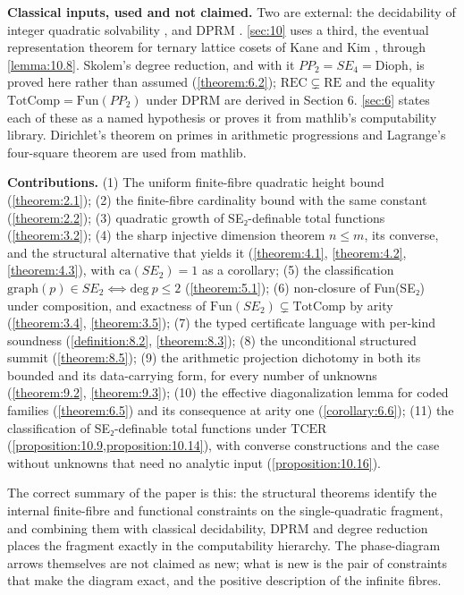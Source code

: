 \documentclass[11pt]{article}
\theoremstyle{plain}
\theoremstyle{definition}
\theoremstyle{remark}
\theoremstyle{plain}
\theoremstyle{definition}
\theoremstyle{remark}
\theoremstyle{plain}
\theoremstyle{definition}
\theoremstyle{remark}
\begin{document}
\textbf{Classical inputs, used and not claimed.} Two are external: the decidability of integer quadratic solvability \cite{GS04}, and DPRM \cite{DPR61,Mat70}. \cref{sec:10} uses a third, the eventual representation theorem for ternary lattice cosets of Kane and Kim \cite{KK26}, through \cref{lemma:10.8}. Skolem's degree reduction, and with it $PP_{2} = SE_{4} = \mathrm{Dioph}$, is proved here rather than assumed (\cref{theorem:6.2}); $\mathrm{REC} ⊊ \mathrm{RE}$ and the equality $\mathrm{TotComp} = \mathrm{Fun}(PP_{2})$ under DPRM are derived in Section 6. \cref{sec:6} states each of these as a named hypothesis or proves it from mathlib's computability library. Dirichlet's theorem on primes in arithmetic progressions and Lagrange's four-square theorem are used from mathlib.

\textbf{Contributions.} (1) The uniform finite-fibre quadratic height bound (\cref{theorem:2.1}); (2) the finite-fibre cardinality bound with the same constant (\cref{theorem:2.2}); (3) quadratic growth of SE₂-definable total functions (\cref{theorem:3.2}); (4) the sharp injective dimension theorem $n ≤ m$, its converse, and the structural alternative that yields it (\cref{theorem:4.1}, \cref{theorem:4.2}, \cref{theorem:4.3}), with $\mathrm{ca}(SE_{2}) = 1$ as a corollary; (5) the classification $\mathrm{graph}(p) ∈ SE_{2} ⟺ \mathrm{deg}\ p ≤ 2$ (\cref{theorem:5.1}); (6) non-closure of Fun(SE₂) under composition, and exactness of $\mathrm{Fun}(SE_{2}) ⊊ \mathrm{TotComp}$ by arity (\cref{theorem:3.4}, \cref{theorem:3.5}); (7) the typed certificate language with per-kind soundness (\cref{definition:8.2}, \cref{theorem:8.3}); (8) the unconditional structured summit (\cref{theorem:8.5}); (9) the arithmetic projection dichotomy in both its bounded and its data-carrying form, for every number of unknowns (\cref{theorem:9.2}, \cref{theorem:9.3}); (10) the effective diagonalization lemma for coded families (\cref{theorem:6.5}) and its consequence at arity one (\cref{corollary:6.6}); (11) the classification of SE₂-definable total functions under $\mathrm{TCER}$ (\cref{proposition:10.9,proposition:10.14}), with converse constructions and the case without unknowns that need no analytic input (\cref{proposition:10.16}).

The correct summary of the paper is this: the structural theorems identify the internal finite-fibre and functional constraints on the single-quadratic fragment, and combining them with classical decidability, DPRM and degree reduction places the fragment exactly in the computability hierarchy. The phase-diagram arrows themselves are not claimed as new; what is new is the pair of constraints that make the diagram exact, and the positive description of the infinite fibres.
\end{document}
